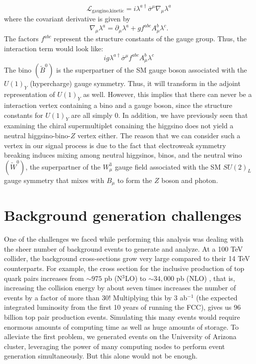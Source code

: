 \[\mathcal{L}_{\text{gaugino,kinetic}} = i\lambda^{a\dagger}\overline{\sigma}^\mu\nabla_\mu\lambda^a\]
where the covariant derivative is given by
\[\nabla_\mu\lambda^a = \partial_\mu\lambda^a + gf^{abc}A_\mu^b\lambda^c.\]
The factors $f^{abc}$ represent the structure constants of the gauge group. Thus, the interaction term would look like:
\[ig\lambda^{a\dagger}\overline{\sigma}^\mu f^{abc}A_\mu^b\lambda^c\]
The bino $(\widetilde{B}^0)$ is the superpartner of the SM gauge boson associated with the $U(1)_Y$ (hypercharge) gauge symmetry. Thus, it will transform in the adjoint representation of $U(1)_Y$ as well. However, this implies that there can never be a interaction vertex containing a bino and a gauge boson, since the structure constants for $U(1)_Y$ are all simply 0. In addition, we have previously seen that examining the chiral supermultiplet conaining the higgsino does not yield a neutral higgsino-bino-$Z$ vertex either. The reason that we can consider such a vertex in our signal process is due to the fact that electroweak symmetry breaking induces mixing among neutral higgsinos, binos, and the neutral wino $(\widetilde{W}^0)$, the superpartner of the $W_\mu^3$ gauge field associated with the SM $SU(2)_L$ gauge symmetry that mixes with $B_\mu$ to form the $Z$ boson and photon.

\section{Background generation challenges}
One of the challenges we faced while performing this analysis was dealing with the sheer number of background events to generate and analyze. At a 100 TeV collider, the background cross-sections grow very large compared to their 14 TeV counterparts. For example, the cross section for the inclusive production of top quark pairs increases from $\sim975$ pb (N$^{3}$LO) to $\sim34,000$ pb (NLO) \citep{Mangano:2016jyj}, that is, increasing the collision energy by about seven times increases the number of events by a factor of more than 30! Multiplying this by 3 ab$^{-1}$ (the expected integrated luminosity from the first 10 years of running the FCC), gives us 96 billion top pair production events. Simulating this many events would require enormous amounts of computing time as well as huge amounts of storage. To alleviate the first problem, we generated events on the University of Arizona cluster, leveraging the power of many computing nodes to perform event generation simultaneously. But this alone would not be enough. 

